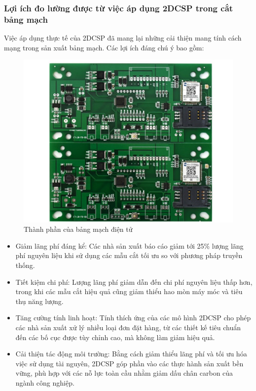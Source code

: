 \subsubsection{Lợi ích đo lường được từ việc áp dụng 2DCSP trong cắt bảng mạch}
\hspace{0.5cm}Việc áp dụng thực tế của 2DCSP đã mang lại những cải thiện mang tính cách mạng trong sản xuất bảng mạch. Các lợi ích đáng chú ý bao gồm:

\begin{figure}[!htp]
    \centering
    \includegraphics[width=0.5\linewidth]{circuit.png}
    \caption{Thành phần của bảng mạch điện tử}
    \label{fig:enter-label}
\end{figure}

\begin{itemize}
    \item Giảm lãng phí đáng kể: Các nhà sản xuất báo cáo giảm tới 25\% lượng lãng phí nguyên liệu khi sử dụng các mẫu cắt tối ưu so với phương pháp truyền thống.
    \item Tiết kiệm chi phí: Lượng lãng phí giảm dẫn đến chi phí nguyên liệu thấp hơn, trong khi các mẫu cắt hiệu quả cũng giảm thiểu hao mòn máy móc và tiêu thụ năng lượng.
    \item Tăng cường tính linh hoạt: Tính thích ứng của các mô hình 2DCSP cho phép các nhà sản xuất xử lý nhiều loại đơn đặt hàng, từ các thiết kế tiêu chuẩn đến các bố cục được tùy chỉnh cao, mà không làm giảm hiệu quả.
    \item Cải thiện tác động môi trường: Bằng cách giảm thiểu lãng phí và tối ưu hóa việc sử dụng tài nguyên, 2DCSP góp phần vào các thực hành sản xuất bền vững, phù hợp với các nỗ lực toàn cầu nhằm giảm dấu chân carbon của ngành công nghiệp.
\end{itemize}
